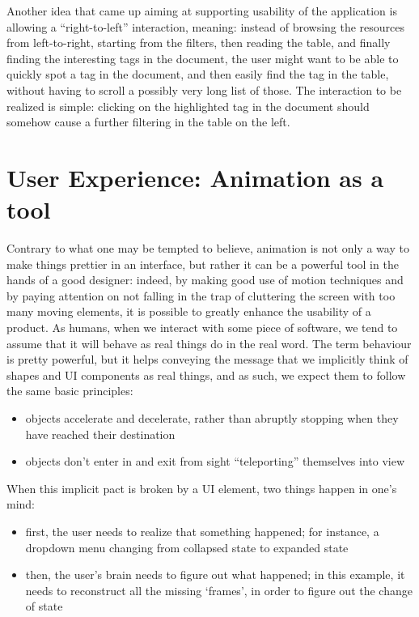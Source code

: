 \documentclass[12pt,svgnames]{memoir}
\begin{document}
Another idea that came up aiming at supporting usability of the
application is allowing a ``right-to-left'' interaction, meaning:
instead of browsing the resources from left-to-right, starting from the
filters, then reading the table, and finally finding the interesting
tags in the document, the user might want to be able to quickly spot a
tag in the document, and then easily find the tag in the table, without
having to scroll a possibly very long list of those. The interaction to
be realized is simple: clicking on the highlighted tag in the document
should somehow cause a further filtering in the table on the left.

\section{User Experience: Animation as a
tool}\label{user-experience-animation-as-a-tool}

Contrary to what one may be tempted to believe, animation is not only a
way to make things prettier in an interface, but rather it can be a
powerful tool in the hands of a good designer: indeed, by making good
use of motion techniques and by paying attention on not falling in the
trap of cluttering the screen with too many moving elements, it is
possible to greatly enhance the usability of a product. As humans, when
we interact with some piece of software, we tend to assume that it will
behave as real things do in the real word. The term behaviour is pretty
powerful, but it helps conveying the message that we implicitly think of
shapes and UI components as real things, and as such, we expect them to
follow the same basic principles:

\begin{itemize}
\itemsep1pt\parskip0pt
\item
  objects accelerate and decelerate, rather than abruptly stopping when
  they have reached their destination
\item
  objects don't enter in and exit from sight ``teleporting'' themselves
  into view
\end{itemize}

When this implicit pact is broken by a UI element, two things happen in
one's mind:

\begin{itemize}
\itemsep1pt\parskip0pt
\item
  first, the user needs to realize that something happened; for
  instance, a dropdown menu changing from collapsed state to expanded
  state
\item
  then, the user's brain needs to figure out what happened; in this
  example, it needs to reconstruct all the missing `frames', in order to
  figure out the change of state
\end{itemize}
\end{document}

